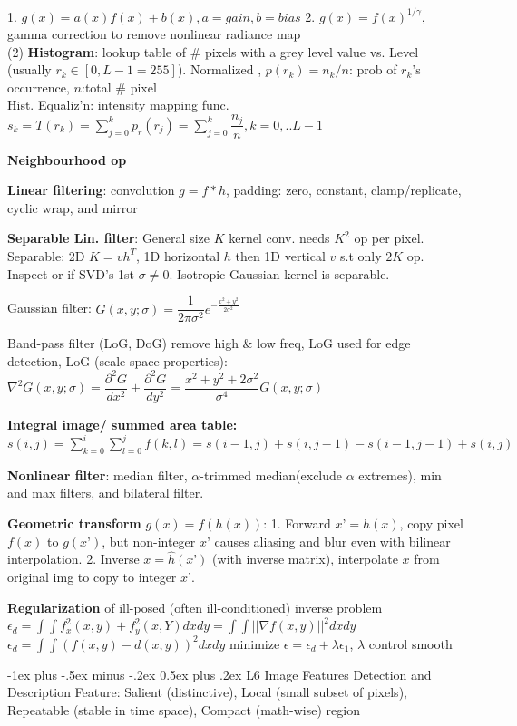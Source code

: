 \documentclass[10pt,landscape]{article}
\makeatletter
\renewcommand{\section}{\@startsection{section}{1}{0mm}%
                                {-1ex plus -.5ex minus -.2ex}%
                                {0.5ex plus .2ex}%
                                {\normalfont\large\bfseries}}
\makeatother
\begin{document}
\begin{multicols}{3}
1. $g(x)=a(x)f(x)+b(x), a=gain, b=bias$
2. $g(x)=f(x)^{1/\gamma}$, gamma correction to remove nonlinear radiance map\\

(2) \textbf{Histogram}: lookup table of \# pixels with a grey level value vs. Level  (usually  $r_k \in [0, L-1=255]$). Normalized , $p(r_k) = n_k/n$: prob of $r_k$’s occurrence, $n$:total \# pixel\\
Hist. Equaliz’n: intensity mapping func. $s_k = T(r_k) = \sum_{j=0}^k p_r(r_j) = \sum_{j=0}^k \dfrac{n_j}{n}, k=0,..L-1$

\textbf{Neighbourhood op}

\textbf{Linear filtering}: convolution $g=f*h$, padding: zero, constant, clamp/replicate, cyclic wrap, and mirror

\textbf{Separable Lin. filter}: General size $K$ kernel conv. needs $K^2$ op per pixel. Separable: 2D $K=vh^T$, 1D horizontal $h$ then 1D vertical $v$ s.t only $2K$ op. Inspect or if SVD’s 1st $\sigma \neq 0$. Isotropic Gaussian kernel is separable.

Gaussian filter: $G(x, y; \sigma) = \dfrac{1}{2\pi \sigma^2}e^{-\frac{x^2 + y^2}{2\sigma^2}}$

Band-pass filter (LoG, DoG) remove high & low freq, LoG used for edge detection, LoG (scale-space properties): $\nabla^2G(x,y;\sigma) = \dfrac{\partial^2G}{dx^2}+\dfrac{\partial^2G}{dy^2}=\dfrac{x^2 + y^2 + 2\sigma^2}{\sigma^4}G(x,y;\sigma)$

\textbf{Integral image/ summed area table:}$s(i,j) =\sum_{k=0}^i\sum_{l=0}^{j}f(k,l)= s(i-1,j)+s(i,j-1)-s(i-1,j-1)+s(i,j)$

\textbf{Nonlinear filter}: median filter, $\alpha$-trimmed median(exclude $\alpha$ extremes), min and max filters, and bilateral filter.

\textbf{Geometric transform} $g(x)=f(h(x))$:
1. Forward $x’=h(x)$, copy pixel $f(x)$ to $g(x’)$, but non-integer $x’$ causes aliasing and blur even with bilinear interpolation. 
2. Inverse $x=\hat{h}(x’)$ (with inverse matrix), interpolate $x$ from original img to copy to integer $x’$.

\textbf{Regularization} of ill-posed (often ill-conditioned) inverse problem
$\epsilon_d = \int\int f_x^2(x,y) + f_y^2(x,Y)dxdy = \int\int||\nabla f(x,y)||^2dxdy$
$\epsilon_d = \int\int (f(x,y) - d(x,y))^2dxdy$
minimize $\epsilon=\epsilon_d + \lambda \epsilon_1$, $\lambda$ control smooth 

\section{L6 Image Features Detection and Description}
Feature: Salient (distinctive), Local (small subset of pixels), Repeatable (stable in time space), Compact (math-wise) region


\end{multicols}
\end{document}
